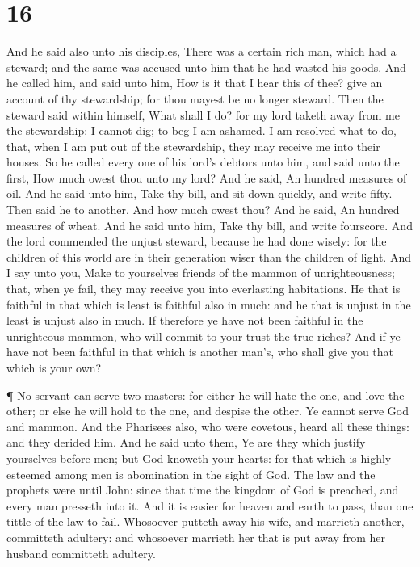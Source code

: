 \hypertarget{section-15}{%
\section{16}\label{section-15}}

 And he said also unto his disciples, There was a certain
rich man, which had a steward; and the same was accused unto him that he
had wasted his goods.  And he called him, and said unto him,
How is it that I hear this of thee? give an account of thy stewardship;
for thou mayest be no longer steward.  Then the steward said
within himself, What shall I do? for my lord taketh away from me the
stewardship: I cannot dig; to beg I am ashamed.  I am
resolved what to do, that, when I am put out of the stewardship, they
may receive me into their houses.  So he called every one of
his lord's debtors unto him, and said unto the first, How much owest
thou unto my lord?  And he said, An hundred measures of oil.
And he said unto him, Take thy bill, and sit down quickly, and write
fifty.  Then said he to another, And how much owest thou?
And he said, An hundred measures of wheat. And he said unto him, Take
thy bill, and write fourscore.  And the lord commended the
unjust steward, because he had done wisely: for the children of this
world are in their generation wiser than the children of light.
 And I say unto you, Make to yourselves friends of the
mammon of unrighteousness; that, when ye fail, they may receive you into
everlasting habitations.  He that is faithful in that which
is least is faithful also in much: and he that is unjust in the least is
unjust also in much.  If therefore ye have not been
faithful in the unrighteous mammon, who will commit to your trust the
true riches?  And if ye have not been faithful in that
which is another man's, who shall give you that which is your own?

 ¶ No servant can serve two masters: for either he will
hate the one, and love the other; or else he will hold to the one, and
despise the other. Ye cannot serve God and mammon.  And the
Pharisees also, who were covetous, heard all these things: and they
derided him.  And he said unto them, Ye are they which
justify yourselves before men; but God knoweth your hearts: for that
which is highly esteemed among men is abomination in the sight of God.
 The law and the prophets were until John: since that time
the kingdom of God is preached, and every man presseth into it.
 And it is easier for heaven and earth to pass, than one
tittle of the law to fail.  Whosoever putteth away his
wife, and marrieth another, committeth adultery: and whosoever marrieth
her that is put away from her husband committeth adultery.

